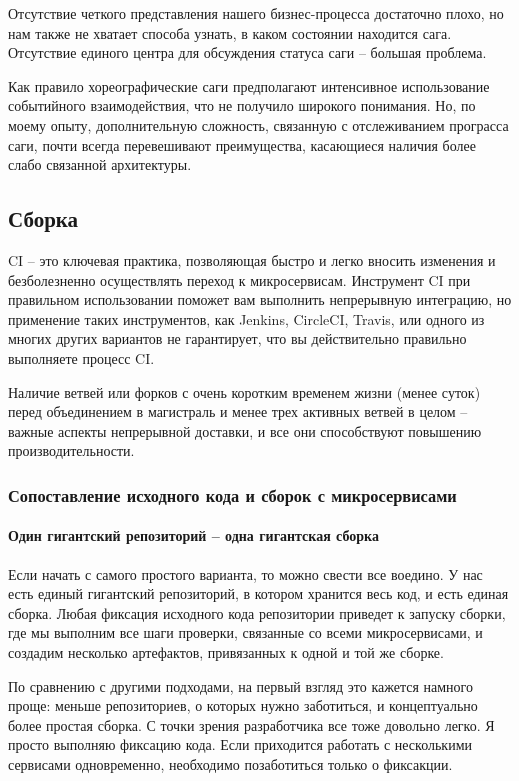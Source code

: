 \documentclass[%
	11pt,
	a4paper,
	utf8,
		]{article}
\begin{document}
Отсутствие четкого представления нашего бизнес-процесса достаточно плохо, но нам также не хватает способа узнать, в каком состоянии находится сага. Отсутствие единого центра для обсуждения статуса саги -- большая проблема.

Как правило хореографические саги предполагают интенсивное использование событийного взаимодействия, что не получило широкого понимания. Но, по моему опыту, дополнительную сложность, связанную с отслеживанием програсса саги, почти всегда перевешивают преимущества, касающиеся наличия более слабо связанной архитектуры.

\subsection{Сборка}

CI -- это ключевая практика, позволяющая быстро и легко вносить изменения и безболезненно осуществлять переход к микросервисам. Инструмент CI при правильном использовании поможет вам выполнить непрерывную интеграцию, но применение таких инструментов, как Jenkins, CircleCI, Travis, или одного из многих других вариантов не гарантирует, что вы действительно правильно выполняете процесс CI.

Наличие ветвей или форков с очень коротким временем жизни (менее суток) перед объединением в магистраль и менее трех активных ветвей в целом -- важные аспекты непрерывной доставки, и все они способствуют повышению производительности.

\subsubsection{Сопоставление исходного кода и сборок с микросервисами}

\paragraph{Один гигантский репозиторий -- одна гигантская сборка} Если начать с самого простого варианта, то можно свести все воедино. У нас есть единый гигантский репозиторий, в котором хранится весь код, и есть единая сборка. Любая фиксация исходного кода репозитории приведет к запуску сборки, где мы выполним все шаги проверки, связанные со всеми микросервисами, и создадим несколько артефактов, привязанных к одной и той же сборке.

По сравнению с другими подходами, на первый взгляд это кажется намного проще: меньше репозиториев, о которых нужно заботиться, и концептуально более простая сборка. С точки зрения разработчика все тоже довольно легко. Я просто выполняю фиксацию кода. Если приходится работать с несколькими сервисами одновременно, необходимо позаботиться только о фиксакции.
\end{document}
